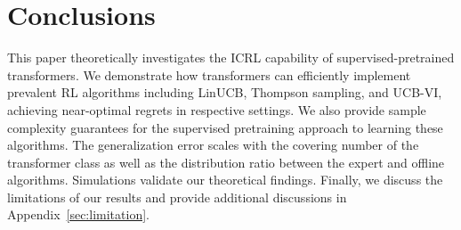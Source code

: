 \section{Conclusions}

This paper theoretically investigates the ICRL capability of supervised-pretrained transformers. We demonstrate how transformers can efficiently implement prevalent RL algorithms including LinUCB, Thompson sampling, and UCB-VI, achieving near-optimal regrets in respective settings. We also provide sample complexity guarantees for the supervised pretraining approach to learning these algorithms. The generalization error scales with the covering number of the transformer class as well as the distribution ratio between the expert and offline algorithms. Simulations validate our theoretical findings.
Finally, we discuss the limitations of our results and provide additional discussions in Appendix~\ref{sec:limitation}.



